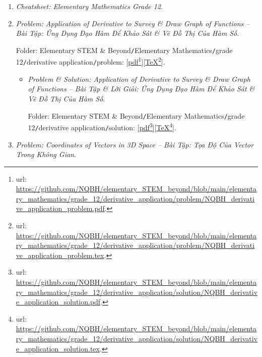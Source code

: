 \documentclass[12pt]{article}
\begin{document}
\begin{enumerate}
	\item {\it Cheatsheet: Elementary Mathematics Grade 12}.
	\item {\it Problem: Application of Derivative to Survey \& Draw Graph of Functions -- Bài Tập: Ứng Dụng Đạo Hàm Để Khảo Sát \& Vẽ Đồ Thị Của Hàm Số}.
	
	Folder: {\sf Elementary STEM \& Beyond{\tt/}Elementary Mathematics{\tt/}grade 12{\tt/}derivative application{\tt/}problem}: [\href{https://github.com/NQBH/elementary_STEM_beyond/blob/main/elementary_mathematics/grade_12/derivative_application/problem/NQBH_derivative_application_problem.pdf}{pdf}\footnote{{\sc url}: \url{https://github.com/NQBH/elementary_STEM_beyond/blob/main/elementary_mathematics/grade_12/derivative_application/problem/NQBH_derivative_application_problem.pdf}.}][\href{https://github.com/NQBH/elementary_STEM_beyond/blob/main/elementary_mathematics/grade_12/derivative_application/problem/NQBH_derivative_application_problem.tex}{\TeX}\footnote{{\sc url}: \url{https://github.com/NQBH/elementary_STEM_beyond/blob/main/elementary_mathematics/grade_12/derivative_application/problem/NQBH_derivative_application_problem.tex}.}].
	\begin{itemize}
		\item {\it Problem \& Solution: Application of Derivative to Survey \& Draw Graph of Functions -- Bài Tập \& Lời Giải: Ứng Dụng Đạo Hàm Để Khảo Sát \& Vẽ Đồ Thị Của Hàm Số}.
		
		Folder: {\sf Elementary STEM \& Beyond{\tt/}Elementary Mathematics{\tt/}grade 12{\tt/}derivative application{\tt/}solution}: [\href{https://github.com/NQBH/elementary_STEM_beyond/blob/main/elementary_mathematics/grade_12/derivative_application/solution/NQBH_derivative_application_solution.pdf}{pdf}\footnote{{\sc url}: \url{https://github.com/NQBH/elementary_STEM_beyond/blob/main/elementary_mathematics/grade_12/derivative_application/solution/NQBH_derivative_application_solution.pdf}.}][\href{https://github.com/NQBH/elementary_STEM_beyond/blob/main/elementary_mathematics/grade_12/derivative_application/solution/NQBH_derivative_application_solution.tex}{\TeX}\footnote{{\sc url}: \url{https://github.com/NQBH/elementary_STEM_beyond/blob/main/elementary_mathematics/grade_12/derivative_application/solution/NQBH_derivative_application_solution.tex}.}].
	\end{itemize}
	\item {\it Problem: Coordinates of Vectors in 3D Space -- Bài Tập: Tọa Độ Của Vector Trong Không Gian}.
	

\end{enumerate}
\end{document}
